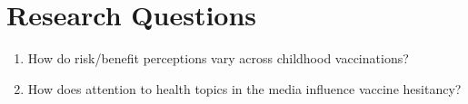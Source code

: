 \documentclass[12pt,]{article}
\providecommand{\tightlist}{%
  \setlength{\itemsep}{0pt}\setlength{\parskip}{0pt}}
\begin{document}
\hypertarget{research-questions}{%
\section{Research Questions}\label{research-questions}}

\begin{enumerate}
\def\labelenumi{\arabic{enumi}.}
\tightlist
\item
  How do risk/benefit perceptions vary across childhood vaccinations?
\item
  How does attention to health topics in the media influence vaccine hesitancy?
\end{enumerate}

\printbibliography
\end{document}
